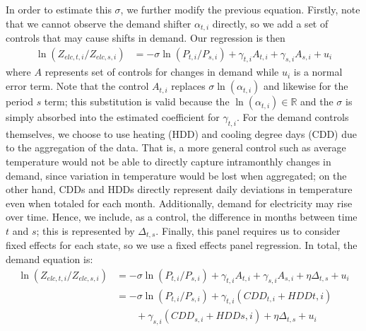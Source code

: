 \documentclass[12pt,a4paper]{extarticle}
\begin{document}
In order to estimate this $\sigma$, we further modify the previous equation. 
Firstly, note that we cannot observe the demand shifter $\alpha_{t,i}$ directly, so we add a set of controls that may cause shifts in demand. Our regression is then
\begin{align*}
\ln (Z_{elc, t, i} / Z_{elc, s, i}) &= -\sigma \ln (P_{t,i} / P_{s,i}) +  \gamma_{t,i} A_{t,i} + \gamma_{s,i} A_{s,i} + u_i
\end{align*}
where $A$ represents set of controls for changes in demand while $u_i$ is a normal error term. Note that the control  $A_{t,i}$ replaces $\sigma \ln(\alpha_{t,i})$ and likewise for the period $s$ term; this substitution is valid because the $\ln(\alpha_{t,i}) \in \mathbb{R}$ and the $\sigma$ is simply absorbed into the estimated coefficient for $\gamma_{t,i}$. For the demand controls themselves, we choose to use heating (HDD) and cooling degree days (CDD) due to the aggregation of the data. That is, a more general control such as average temperature would not be able to directly capture intramonthly changes in demand, since variation in temperature would be lost when aggregated; on the other hand, CDDs and HDDs directly represent daily deviations in temperature even when totaled for each month. Additionally, demand for electricity may rise over time. Hence, we include, as a control, the difference in months between time $t$ and $s$; this is represented by $\Delta_{t,s}$. Finally, this panel requires us to consider fixed effects for each state, so we use a fixed effects panel regression. In total, the demand equation is:
\begin{align*}
\ln (Z_{elc, t, i} / Z_{elc, s, i}) &= -\sigma \ln (P_{t,i} / P_{s,i}) +  \gamma_{t,i} A_{t,i} + \gamma_{s,i} A_{s,i} + \eta \Delta_{t,s} + u_i \\
&= -\sigma \ln (P_{t,i} / P_{s,i}) +  \gamma_{t,i} \left( CDD_{t,i} + HDD{t,i} \right) \\
&\qquad + \gamma_{s,i} \left( CDD_{s,i} + HDD{s,i} \right)  + \eta \Delta_{t,s} + u_i
\end{align*}
\end{document}
